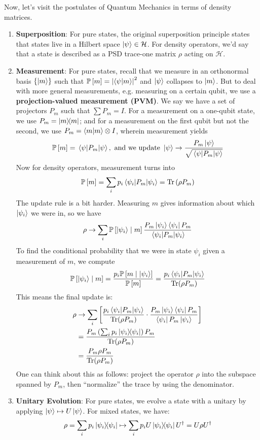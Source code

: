 Now, let's visit the postulates of Quantum Mechanics in terms of density matrices.
\begin{theorem}
    \begin{enumerate}
    \item \textbf{Superposition}: For pure states, the original superposition principle states that states live in a Hilbert space $\ket{\psi} \in \mathcal{H}$. For density operators,
    we'd say that a state is described as a PSD trace-one matrix $\rho$ acting on $\mathcal{H}$.
    \item \textbf{Measurement}: For pure states, recall that we measure in an orthonormal basis $\{\ket{m}\}$ such that
    $\mathbb{P}\left[ m \right] = \qty|\braket{\psi}{m}|^2$ and $\ket{\psi}$ collapses to $\ket{m}$. But to deal with more general measurements,
    e.g. measuring on a certain qubit, we use a \textbf{projection-valued measurement (PVM)}. We say we have a set of projectors
    $P_m$ such that $\sum P_m = I$. For a measurement on a one-qubit state, we use $P_m = \ketbra{m}{m}$; and for a measurement on the first qubit but not the second,
    we use $P_m = \braket{m}{m} \otimes I$, wherein measurement yields
    \[ \mathbb{P}\left[ m \right] = \mel{\psi}{P_m}{\psi}, \text{ and we update } \ket{\psi} \to \frac{P_m \ket{\psi}}{\sqrt{\mel{\psi}{P_m}{\psi}}} \]
    Now for density operators, measurement turns into
    \[ \mathbb{P}\left[ m \right] = \sum_i p_i \mel{\psi_i}{P_m}{\psi_i} = \Tr\qty(\rho P_m) \]
    The update rule is a bit harder. Measuring $m$ gives information about which $\ket{\psi_i}$ we were in, so we have 
    \[ \rho \to \sum_i \mathbb{P}\left[ \ket{\psi_i} \mid m \right] \frac{P_m \ket{\psi_i} \bra{\psi_i} P_m}{\mel{\psi_i}{P_m}{\psi_i}} \]
    To find the conditional probability that we were in state $\psi_i$ given a measurement of $m$, we compute 
    \[ \mathbb{P}\left[ \ket{\psi_i} \mid m \right] = \frac{p_i \mathbb{P}\left[ m \mid \ket{\psi_i} \right]}{\mathbb{P}\left[ m \right]} = \frac{p_i\mel{\psi_i}{P_m}{\psi_i}}{\Tr(\rho P_m)} \]
    This means the final update is:
    \begin{align*}
        \rho &\to \sum_i \left[\frac{p_i\mel{\psi_i}{P_m}{\psi_i}}{\Tr(\rho P_m)} \cdot \frac{P_m \ket{\psi_i} \bra{\psi_i} P_m}{\bra{\psi_i} P_m \ket{\psi_i}}\right] \\
        &= \frac{P_m \left(\sum_i p_i \ketbra{\psi_i}{\psi_i}\right) P_m}{\Tr(\rho P_m)}\\
        &= \frac{P_m \rho P_m}{\Tr(\rho P_m)}
    \end{align*}
    One can think about this as follows: project the operator $\rho$ into the subspace spanned by $P_m$,
    then ``normalize'' the trace by using the denominator.
    \item \textbf{Unitary Evolution}: For pure states, we evolve a state with a unitary by applying $\ket{\psi} \mapsto U\ket{\psi}$. For mixed states, we have:
    \[ \rho = \sum_i p_i \ketbra{\psi_i}{\psi_i} \mapsto \sum_i p_i U \ketbra{\psi_i}{\psi_i} U^{\dagger} = U \rho U^{\dagger} \]
    \end{enumerate}
\end{theorem}

